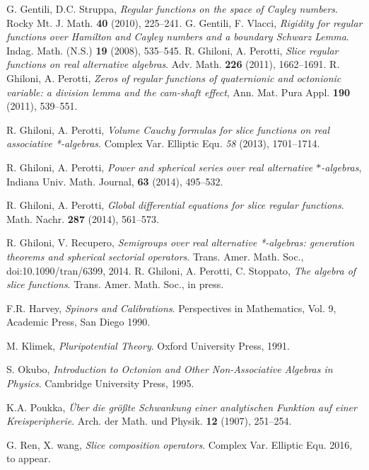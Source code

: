 \documentclass{amsart}
\theoremstyle{definition}
\theoremstyle{remark}
\numberwithin{equation}{section}
\begin{document}
\begin{thebibliography}{99}
 G. Gentili, D.C. Struppa, \textit{Regular functions on the space of Cayley numbers}. Rocky Mt. J. Math. \textbf{40} (2010), 225--241.
 G. Gentili, F. Vlacci, \textit{Rigidity for regular functions over Hamilton and Cayley numbers and a boundary Schwarz Lemma}. Indag. Math. (N.S.) \textbf{19} (2008), 535--545.
 R. Ghiloni, A. Perotti, \textit{Slice regular functions on real alternative algebras}. Adv. Math. \textbf{226} (2011), 1662--1691.
 R. Ghiloni, A. Perotti, \textit{Zeros of regular functions of quaternionic and octonionic variable: a division lemma and the
cam-shaft effect}, Ann. Mat. Pura Appl. \textbf{190} (2011), 539--551.

 R. Ghiloni, A. Perotti, \textit{Volume Cauchy formulas for slice functions on real associative *-algebras}. Complex Var. Elliptic Equ. \textit{58} (2013),  1701--1714.

 R. Ghiloni, A. Perotti, \textit{Power and spherical series over real alternative $\ast$-algebras}, Indiana Univ. Math. Journal, \textbf{63} (2014),  495--532.

 R. Ghiloni, A. Perotti, \textit{Global differential equations for slice regular functions}. Math. Nachr. \textbf{287} (2014), 561--573.

 R. Ghiloni, V. Recupero, \textit{Semigroups over real alternative *-algebras: generation theorems and spherical sectorial operators}. Trans. Amer. Math. Soc., doi:10.1090/tran/6399, 2014.
 R. Ghiloni, A. Perotti, C. Stoppato, \textit{The algebra of slice functions}. Trans. Amer. Math. Soc., in press.

 F.R. Harvey, \textit{Spinors and Calibrations}. Perspectives in Mathematics, Vol. 9, Academic Press, San Diego 1990.

 M. Klimek, \textit{Pluripotential Theory}. Oxford University Press, 1991.

 S. Okubo, \textit{Introduction to Octonion and Other Non-Associative Algebras in Physics}. Cambridge University Press, 1995.

 K.A. Poukka,  \textit{\"{U}ber die gr\"{o}{\ss}te Schwankung einer analytischen Funktion auf einer Kreisperipherie}. Arch. der Math. und Physik. \textbf{12} (1907), 251--254.

 G. Ren, X. wang, \textit{Slice composition operators}.  Complex Var. Elliptic Equ. 2016, to appear.


\end{thebibliography}
\end{document}
